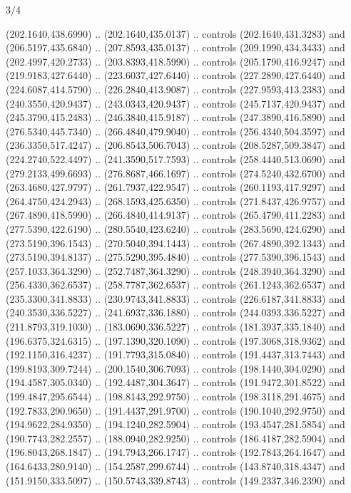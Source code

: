 \begin{flagdescription}{3/4}
\begin{scope}[xshift=0.6667\flaglength,yshift=0.6806\flagwidth,scale=\flagwidth/410]
\begin{scope}[y=-0.6pt, x=0.6pt,xshift=-114,yshift=252]
  (202.1640,438.6990) .. (202.1640,435.0137) .. controls (202.1640,431.3283) and
  (206.5197,435.6840) .. (207.8593,435.0137) .. controls (209.1990,434.3433) and
  (202.4997,420.2733) .. (203.8393,418.5990) .. controls (205.1790,416.9247) and
  (219.9183,427.6440) .. (223.6037,427.6440) .. controls (227.2890,427.6440) and
  (224.6087,414.5790) .. (226.2840,413.9087) .. controls (227.9593,413.2383) and
  (240.3550,420.9437) .. (243.0343,420.9437) .. controls (245.7137,420.9437) and
  (245.3790,415.2483) .. (246.3840,415.9187) .. controls (247.3890,416.5890) and
  (276.5340,445.7340) .. (266.4840,479.9040) .. controls (256.4340,504.3597) and
  (236.3350,517.4247) .. (206.8543,506.7043) .. controls (208.5287,509.3847) and
  (224.2740,522.4497) .. (241.3590,517.7593) .. controls (258.4440,513.0690) and
  (279.2133,499.6693) .. (276.8687,466.1697) .. controls (274.5240,432.6700) and
  (263.4680,427.9797) .. (261.7937,422.9547) .. controls (260.1193,417.9297) and
  (264.4750,424.2943) .. (268.1593,425.6350) .. controls (271.8437,426.9757) and
  (267.4890,418.5990) .. (266.4840,414.9137) .. controls (265.4790,411.2283) and
  (277.5390,422.6190) .. (280.5540,423.6240) .. controls (283.5690,424.6290) and
  (273.5190,396.1543) .. (270.5040,394.1443) .. controls (267.4890,392.1343) and
  (273.5190,394.8137) .. (275.5290,395.4840) .. controls (277.5390,396.1543) and
  (257.1033,364.3290) .. (252.7487,364.3290) .. controls (248.3940,364.3290) and
  (256.4330,362.6537) .. (258.7787,362.6537) .. controls (261.1243,362.6537) and
  (235.3300,341.8833) .. (230.9743,341.8833) .. controls (226.6187,341.8833) and
  (240.3530,336.5227) .. (241.6937,336.1880) .. controls (244.0393,336.5227) and
  (211.8793,319.1030) .. (183.0690,336.5227) .. controls (181.3937,335.1840) and
  (196.6375,324.6315) .. (197.1390,320.1090) .. controls (197.3068,318.9362) and
  (192.1150,316.4237) .. (191.7793,315.0840) .. controls (191.4437,313.7443) and
  (199.8193,309.7244) .. (200.1540,306.7093) .. controls (198.1440,304.0290) and
  (194.4587,305.0340) .. (192.4487,304.3647) .. controls (191.9472,301.8522) and
  (199.4847,295.6544) .. (198.8143,292.9750) .. controls (198.3118,291.4675) and
  (192.7833,290.9650) .. (191.4437,291.9700) .. controls (190.1040,292.9750) and
  (194.9622,284.9350) .. (194.1240,282.5904) .. controls (193.4547,281.5854) and
  (190.7743,282.2557) .. (188.0940,282.9250) .. controls (186.4187,282.5904) and
  (196.8043,268.1847) .. (194.7943,266.1747) .. controls (192.7843,264.1647) and
  (164.6433,280.9140) .. (154.2587,299.6744) .. controls (143.8740,318.4347) and
  (151.9150,333.5097) .. (150.5743,339.8743) .. controls (149.2337,346.2390) and

\end{scope}
\end{scope}
\end{flagdescription}
